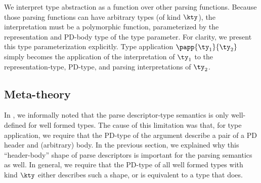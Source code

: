 We interpret type abstraction as a function over other parsing
functions. Because those parsing functions can have
arbitrary \ddc{} types (of kind $\kty$), the interpretation must be a
polymorphic function, parameterized by the representation and PD-body
type of the \ddc{} type parameter.  For clarity, we present
this type parameterization explicitly.  Type application $\papp
{\ty_1}{\ty_2}$ simply becomes the application of the interpretation
of $\ty_1$ to the representation-type, PD-type, and parsing
interpretations of $\ty_2$.



\subsection{Meta-theory}
\label{sec:meta-theory}

In , we informally noted that the parse
descriptor-type semantics is only well-defined for well formed types.
The cause of this limitation was that, for type application, we
require that the PD-type of the argument describe a pair of a PD
header and (arbitrary) body. In the previous section, we explained why
this ``header-body'' shape of parse descriptors is important for the
parsing semantics as well. In general, we require that the PD-type of
all well formed types with kind $\kty$ either describes such a shape, or
is equivalent to a type that does.  

